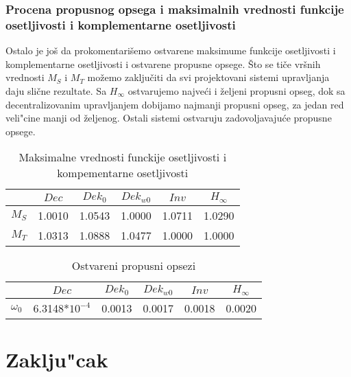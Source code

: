 \documentclass[a4paper,11pt]{article}
\theoremstyle{definition} \newtheorem{deff}{Definicija}[section]
\theoremstyle{definition} \newtheorem{prim}[deff]{Primer}
\theoremstyle{plain} \newtheorem{teor}[deff]{Teorema}
\begin{document}
			\newpage
			
			\subsubsection{Procena propusnog opsega i maksimalnih vrednosti funkcije osetljivosti i komplementarne osetljivosti}
			
			
			Ostalo je još da prokomentarišemo ostvarene maksimume funkcije osetljivosti i komplementarne osetljivosti i ostvarene propusne opsege. Što se tiče vršnih vrednosti $M_S$ i $M_T$ možemo zaključiti da svi projektovani sistemi upravljanja daju slične rezultate. Sa $H_\infty$ ostvarujemo najveći i željeni propusni opseg, dok sa  decentralizovanim upravljanjem dobijamo najmanji propusni opseg, za jedan red veli"cine manji od željenog. Ostali sistemi ostvaruju zadovoljavajuće propusne opsege. 
			
			\begin{table}[h]
				\centering
				\begin{tabular}{|c|c|c|c|c|c|}
					\hline
					& $Dec$  & $Dek_0$  & $Dek_{w0}$ & $Inv$ & $H_\infty$\\ \hline
					$M_S$ & 1.0010   & 1.0543 & 1.0000   & 1.0711 & 1.0290  \\ \hline
					$M_T$ & 1.0313   & 1.0888 & 1.0477   & 1.0000 & 1.0000  \\ \hline
				\end{tabular}
				\caption{Maksimalne vrednosti funckije osetljivosti i kompementarne osetljivosti}
				\label{tab:msmt}
			\end{table}
			
			
			
			\begin{table}[h]
				\centering
				\begin{tabular}{|c|c|c|c|c|c|}
					\hline
					& $Dec$  & $Dek_0$  & $Dek_{w0}$ & $Inv$ & $H_\infty$\\ \hline
					$\omega_0$ & 6.3148*$10^{-4}$   & 0.0013
					& 0.0017   & 0.0018 & 0.0020  \\ \hline
				\end{tabular}
				\caption{Ostvareni propusni opsezi}
				\label{tab:propusni_opseg}
			\end{table}
			
			\clearpage
			\section{Zaklju"cak}
			\vspace{0.5cm}
			
\end{document}
